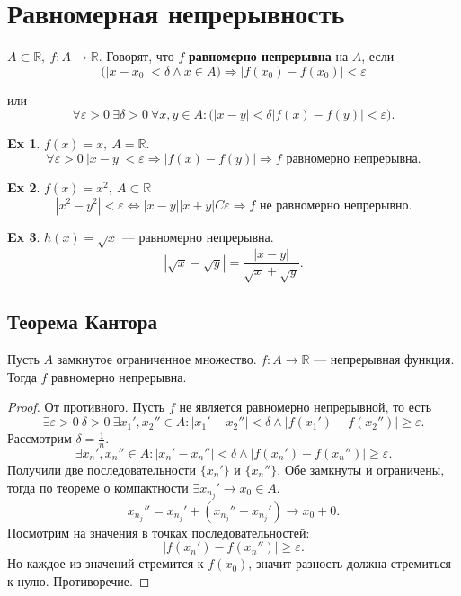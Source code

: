 \documentclass[11pt]{book}
\newcommand{\R}{\mathbb{R}}
\renewcommand{\ge}{\geqslant}
\theoremstyle{definition}
\theoremstyle{plain}
\theoremstyle{plain}
\theoremstyle{definition}
\newtheorem*{ex}{Ex}
\theoremstyle{remark}
\begin{document}
\section{Равномерная непрерывность}
\begin{defn}
    $ A \subset \R, ~ f: A \to  \R$.
    Говорят, что $ f$  {\bf равномерно непрерывна} на $ A$, если
	$$ \bigl(|x-x_0|< \delta \wedge x \in A\bigr) \Longrightarrow |f(x_0) -f(x_0)| < \varepsilon $$

	 или \[
	     \forall \varepsilon >0 ~ \exists \delta  >0 ~ \forall x, y \in A: \bigl( |x-y|< \delta |f(x) -f(y)|< \varepsilon \bigr)
	.\] 
\end{defn}
\begin{ex}
    $ f(x) = x, ~ A = \R$.
    \[
	\forall  \varepsilon >0 ~ |x -y| < \varepsilon  \Longrightarrow  |f(x)-f(y)| \Longrightarrow f \text{ равномерно непрерывна}
    .\] 
\end{ex}
\begin{ex}
    $ f(x) = x^2, ~ A \subset \R$
    \[
    |x^2 - y^2| < \varepsilon  \Longleftrightarrow  |x-y||x+y| C \varepsilon \Longrightarrow f \text{ не равномерно непрерывно}
    .\] 
\end{ex}
\begin{ex}
    $ h(x) = \sqrt {x}$ --- равномерно   непрерывна.
     \[
	 \left| \sqrt{x} - \sqrt{y} \right| = \frac{|x-y|}{\sqrt{x} + \sqrt{y}}
    .\] 
\end{ex}
\subsection{Теорема Кантора}
\begin{thm}[Кантор]\label{th_kantor}
    Пусть $ A$ замкнутое ограниченное множество.  $ f: A \to  \R$ --- непрерывная функция. Тогда $ f$ равномерно непрерывна.
\end{thm}
\begin{proof}
    От противного. Пусть $ f$ не является равномерно непрерывной, то есть \[
	\exists \varepsilon >0 ~ \delta >0 ~ \exists x_1', x_2'' \in A: |x_1'-x_2''| < \delta \wedge |f(x_1')-f(x_2'')| \ge \varepsilon 
    .\] 
    Рассмотрим $ \delta = \frac{1}{n}$.
    \[
	\exists x_{n}', x_{n}'' \in A: |x_{n}' - x_{n}''|<\delta  \wedge |f(x_{n}')-f(x_{n}'')| \ge \varepsilon 
    .\] 
    Получили две последовательности $ \{x_{n}'\}$ и $ \{x_{n}''\}$.
    Обе замкнуты и ограничены, тогда по теореме о компактности $ \exists x_{n_j}' \to  x_0 \in A$.
    \[
	x_{n_j}'' = x_{n_j}' + (x_{n_j}'' - x_{n_j}') \to  x_0 + 0
    .\] 
    Посмотрим на значения в точках последовательностей:
    \[
	|f(x_{n}') - f(x_{n}'')| \ge \varepsilon 
    .\] 
    Но каждое  из значений стремится к  $ f(x_0)$, значит разность должна стремиться к нулю. Противоречие. 
\end{proof}
\end{document}
